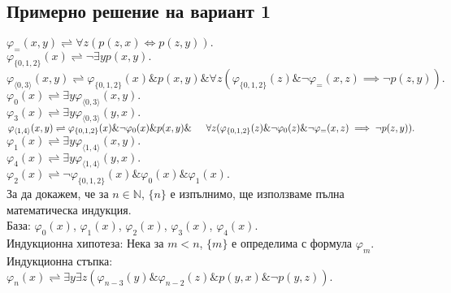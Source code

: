 \documentclass{article}
\begin{document}
\subsection{Примерно решение на вариант 1}
$ \varphi_{=}(x, y) \rightleftharpoons \forall z (p(z, x) \Leftrightarrow p(z, y)). $\\
$ \varphi_{\{0,1,2\}}(x) \rightleftharpoons \lnot \exists y p(x, y).$\\
$ \varphi_{\langle 0, 3 \rangle}(x, y) \rightleftharpoons \varphi_{\{0,1,2\}}(x)\&p(x, y)\& \forall z ( \varphi_{\{0,1,2\}}(z)\&\lnot \varphi_{=}(x, z) \implies \lnot p(z, y)). $\\
$ \varphi_{0}(x) \rightleftharpoons \exists y \varphi_{\langle 0, 3 \rangle}(x, y) . $\\
$ \varphi_{3}(x) \rightleftharpoons \exists y \varphi_{\langle 0, 3 \rangle}(y, x) . $\\
$ \varphi_{\langle 1, 4 \rangle}(x, y) \rightleftharpoons \varphi_{\{0,1,2\}}(x)\&\lnot \varphi_{0}(x)\&p(x, y)\& \\ \indent \forall z ( \varphi_{\{0,1,2\}}(z)\&\lnot \varphi_{0}(z)\&\lnot \varphi_{=}(x, z) \implies \lnot p(z, y)). $\\
$ \varphi_{1}(x) \rightleftharpoons \exists y \varphi_{\langle 1, 4 \rangle}(x, y) . $\\
$ \varphi_{4}(x) \rightleftharpoons \exists y \varphi_{\langle 1, 4 \rangle}(y, x) . $\\
$ \varphi_{2}(x) \rightleftharpoons \lnot \varphi_{\{0,1,2\}}(x)\&\varphi_{0}(x)\&\varphi_{1}(x). $\\

За да докажем, че за $n \in \mathbb{N}$,  $\{n\}$ е изпълнимо, ще използваме пълна математическа индукция. \\
База: $\varphi_{0}(x)$, $\varphi_{1}(x)$, $\varphi_{2}(x)$, $\varphi_{3}(x)$, $\varphi_{4}(x)$. \\
Индукционна хипотеза: Нека за $m <n $, $\{m\}$ е определима с формула $\varphi_{m}$. \\
Индукционна стъпка: $ \varphi_{n}(x) \rightleftharpoons \exists y \exists z (\varphi_{n-3}(y)\&\varphi_{n-2}(z)\&p(y, x)\&\lnot p(y, z)). $\\
\end{document}
